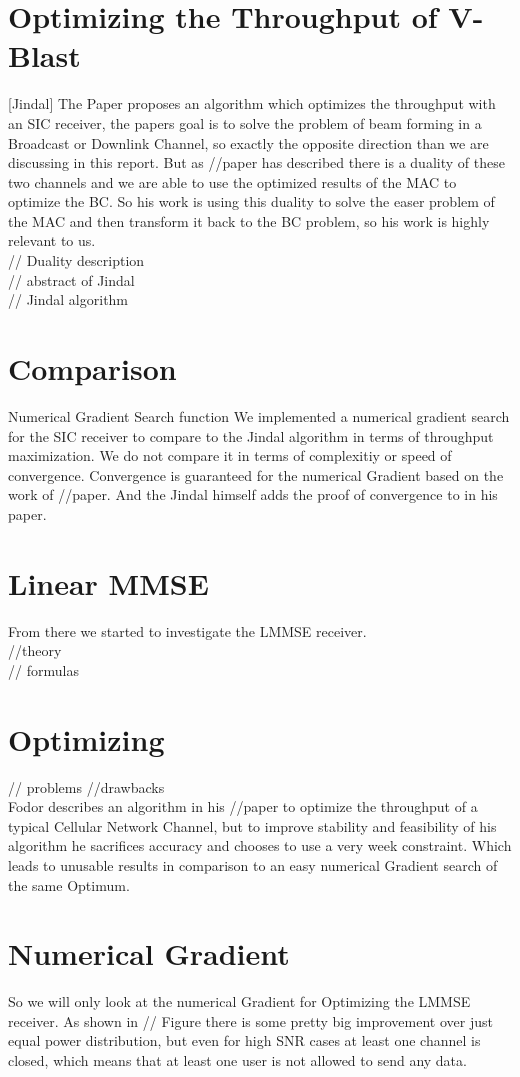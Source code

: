 \documentclass[9pt,draft]{report}
\begin{document}
\section{Optimizing the Throughput of V-Blast}
[Jindal]
The Paper proposes an algorithm which optimizes the throughput with an SIC receiver, the papers goal is to solve the problem of beam forming in a Broadcast or Downlink Channel, so exactly the opposite direction than we are discussing in this report. But as //paper has described there is a duality of these two channels and we are able to use the optimized results of the MAC to optimize the BC. So his work is using this duality to solve the easer problem of the MAC and then transform it back to the BC problem, so his work is highly relevant to us.\\
// Duality description\\
// abstract of Jindal\\
// Jindal algorithm

\section{Comparison}
Numerical Gradient Search function
We implemented a numerical gradient search for the SIC receiver to compare to the Jindal algorithm in terms of throughput maximization. We do not compare it in terms of complexitiy or speed of convergence.
Convergence is guaranteed for the numerical Gradient based on the work of //paper. And the Jindal himself adds the proof of convergence to in his paper.
\section{Linear MMSE}
From there we started to investigate the LMMSE receiver.\\
//theory\\
// formulas\\
\section{Optimizing}
// problems //drawbacks\\
Fodor describes an algorithm in his //paper to optimize the throughput of a typical Cellular Network Channel, but to improve stability and feasibility of his algorithm he sacrifices accuracy and chooses to use a very week constraint. Which leads to unusable results in comparison to an easy numerical Gradient search of the same Optimum.

\section{Numerical Gradient}
So we will only look at the numerical Gradient for Optimizing the LMMSE receiver. As shown in // Figure there is some pretty big improvement over just equal power distribution, but even for high SNR cases at least one channel is closed, which means that at least one user is not allowed to send any data.
\end{document}
